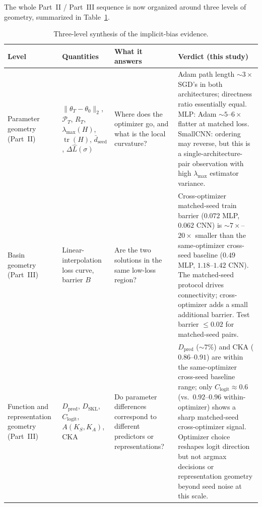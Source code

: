 \documentclass[11pt]{article}
\begin{document}
The whole Part~II / Part~III sequence is now organized around three levels of geometry, summarized in Table~\ref{tab:three-level}.

\begin{table}[H]
\centering
\small
\setlength{\tabcolsep}{3pt}
\begin{tabular}{p{2.4cm}p{4.8cm}p{4.5cm}p{3.5cm}}
\toprule
\textbf{Level} & \textbf{Quantities} & \textbf{What it answers} & \textbf{Verdict (this study)} \\
\midrule
Parameter geometry (Part~II) & $\|\theta_T-\theta_0\|_2$, $\mathcal{P}_T$, $R_T$, $\lambda_{\max}(H)$, $\operatorname{tr}(H)$, $\bar d_{\mathrm{seed}}$, $\Delta\widehat L(\sigma)$ & Where does the optimizer go, and what is the local curvature? & Adam path length $\sim 3\times$ SGD's in both architectures; directness ratio essentially equal. MLP: Adam $\sim 5$--$6\times$ flatter at matched loss. SmallCNN: ordering may reverse, but this is a single-architecture-pair observation with high $\lambda_{\max}$ estimator variance. \\
\addlinespace
Basin geometry (Part~III) & Linear-interpolation loss curve, barrier $B$ & Are the two solutions in the same low-loss region? & Cross-optimizer matched-seed train barrier ($0.072$ MLP, $0.062$ CNN) is $\sim 7\times$--$20\times$ smaller than the same-optimizer cross-seed baseline ($0.49$ MLP, $1.18$--$1.42$ CNN). The matched-seed protocol drives connectivity; cross-optimizer adds a small additional barrier. Test barrier $\le 0.02$ for matched-seed pairs. \\
\addlinespace
Function and representation geometry (Part~III) & $D_{\mathrm{pred}}$, $D_{\mathrm{SKL}}$, $C_{\mathrm{logit}}$, $A(K_S,K_A)$, CKA & Do parameter differences correspond to different predictors or representations? & $D_{\mathrm{pred}}$ ($\sim 7\%$) and CKA ($0.86$--$0.91$) are within the same-optimizer cross-seed baseline range; only $C_{\mathrm{logit}}\approx 0.6$ (vs.\ $0.92$--$0.96$ within-optimizer) shows a sharp matched-seed cross-optimizer signal. Optimizer choice reshapes logit direction but not argmax decisions or representation geometry beyond seed noise at this scale. \\
\bottomrule
\end{tabular}
\caption{Three-level synthesis of the implicit-bias evidence.}
\label{tab:three-level}
\end{table}
\end{document}
